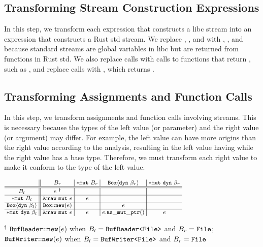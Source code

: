 \subsection{Transforming Stream Construction Expressions}
\label{sec:transformation:streams}

In this step, we transform each expression that constructs a libc stream into an
expression that constructs a Rust std stream.
%
We replace , , and  with , ,
and  because standard streams are global variables in libc but are
returned from functions in Rust std.
%
We also replace  calls with calls to functions that return ,
such as , and replace  calls with
, which returns .

\subsection{Transforming Assignments and Function Calls}
\label{sec:transformation:assignments}

In this step, we transform assignments and function calls involving streams.
%
This is necessary because the types of the left value (or parameter) and the
right value (or argument) may differ.
%
For example, the left value can have more origins than the right value according
to the analysis, resulting in the left value having  while the right
value has a base type.
%
Therefore, we must transform each right value to make it conform to the type of
the left value.

\begin{table}[t]
  \caption{Transformation of right values according to types}
  \label{tab:rvalue}
  \vspace{-1em}
  \centering
  $
  \footnotesize
  \begin{array}{@{~}c@{~}||@{~}c@{~}|@{~}c@{~}|@{~}c@{~}|@{~}c@{~}}
    & B_r & \tptr{B_r} & \tbox{\beta_r} & \tdynptr{\beta_r} \\ \hline\hline
    B_l & e\ ^\dagger & & & \\ \hline
    \tptr{B_l} & \eptr{e} & e & & \\ \hline
    \tbox{\beta_l} & {\tt Box{::}new}(e) & & e & \\ \hline
    \tdynptr{\beta_l} & \eptr{e} & e & e.{\tt as\_mut\_ptr}() & e \\
  \end{array}
  $
  \vspace{0.25em}

  {\scriptsize ${}^\dagger$
  ${\tt BufReader{::}new}(e)$ when $B_l={\tt BufReader\texttt{<}File\texttt{>}}$ and $B_r={\tt File}$;\\[-0.5em]
  ${\tt BufWriter{::}new}(e)$ when $B_l={\tt BufWriter\texttt{<}File\texttt{>}}$ and $B_r={\tt File}$}
  \vspace{-1em}
\end{table}


